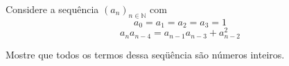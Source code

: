 Considere a sequência $(a_n)_{n\in \mathbb{N}}$ com $$a_0 = a_1 = a_2 = a_3 = 1$$
$$a_n a_{n-4} = a_{n-1} a_{n-3} + a_{n-2}^2$$

Mostre que todos os termos dessa seqüência são números inteiros.